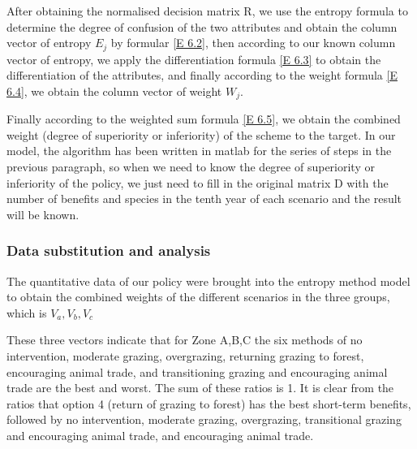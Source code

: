 \documentclass{mcmthesis}
\numberwithin{figure}{section}
\numberwithin{table}{section}
\numberwithin{equation}{section}
\begin{document}
After obtaining the normalised decision matrix R, we use the entropy formula to determine the degree of confusion of the two attributes and obtain the column vector of entropy $E_j$ by formular \ref{E 6.2}, then according to our known column vector of entropy, we apply the differentiation formula \ref{E 6.3} to obtain the differentiation of the attributes, and finally according to the weight formula \ref{E 6.4}, we obtain the column vector of weight $W_j$. 

Finally according to the weighted sum formula \ref{E 6.5}, we obtain the combined weight (degree of superiority or inferiority) of the scheme to the target.
In our model, the algorithm has been written in matlab for the series of steps in the previous paragraph, so when we need to know the degree of superiority or inferiority of the policy, we just need to fill in the original matrix D with the number of benefits and species in the tenth year of each scenario and the result will be known.


\subsubsection{Data substitution and analysis}

The quantitative data of our policy were brought into the entropy method model to obtain the combined weights of the different scenarios in the three groups, which is $V_a ,V_b,V_c$


These three vectors indicate that for Zone A,B,C the six methods of no intervention, moderate grazing, overgrazing, returning grazing to forest, encouraging animal trade, and transitioning grazing and encouraging animal trade are the best and worst.%
The sum of these ratios is 1. It is clear from the ratios that option 4 (return of grazing to forest) has the best short-term benefits, followed by no intervention, moderate grazing, overgrazing, transitional grazing and encouraging animal trade, and encouraging animal trade.
\end{document}
